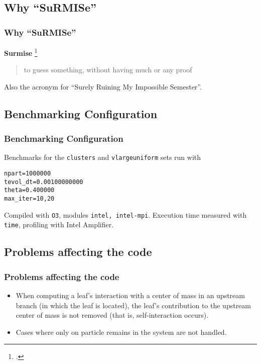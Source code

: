 \begin{frame}
	\section{Why ``SuRMISe''}
	\frametitle{Why ``SuRMISe''}
	\textbf{Surmise} \footcite{surmise}
	\begin{quote}
		to guess something, without having much or any proof
	\end{quote}
	\par
	\vspace{1cm}
	Also the acronym for ``\alert{Su}rely \alert{R}uining \alert{M}y \alert{I}mpossible \alert{Se}mester''.
\end{frame}

\begin{frame}[fragile]
	\section{Benchmarking Configuration}
	\frametitle{Benchmarking Configuration}
	Benchmarks for the \lstinline|clusters| and \lstinline|vlargeuniform| sets run with
\begin{lstlisting}
npart=1000000
tevol_dt=0.00100000000
theta=0.400000
max_iter=10,20
\end{lstlisting}
	Compiled with \lstinline|O3|, modules \lstinline|intel, intel-mpi|. Execution time measured with \lstinline|time|, profiling with Intel Amplifier.
\end{frame}

\begin{frame}
	\section{Problems affecting the code}
	\frametitle{Problems affecting the code}
	\begin{itemize}
		\item When computing a leaf's interaction with a center of mass in an upstream branch (in which the leaf is located), the leaf's contribution to the upstream center of mass is not removed (that is, self-interaction occurs).
		\item Cases where only on particle remains in the system are not handled.
	\end{itemize}
\end{frame}